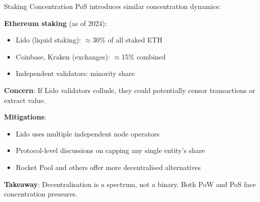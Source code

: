 \documentclass[10pt]{beamer}
\begin{document}
\begin{frame}{Staking Concentration}
  PoS introduces similar concentration dynamics:
  
  \vspace{1em}
  \textbf{Ethereum staking} (as of 2024):
  \begin{itemize}
    \item Lido (liquid staking): $\approx$30\% of all staked ETH
    \item Coinbase, Kraken (exchanges): $\approx$15\% combined
    \item Independent validators: minority share
  \end{itemize}
  
  \vspace{1em}
  \textbf{Concern}: If Lido validators collude, they could potentially censor transactions or extract value.
  
  \vspace{1em}
  \textbf{Mitigations}:
  \begin{itemize}
    \item Lido uses multiple independent node operators
    \item Protocol-level discussions on capping any single entity's share
    \item Rocket Pool and others offer more decentralised alternatives
  \end{itemize}
  
  \vspace{1em}
  \textbf{Takeaway}: Decentralisation is a spectrum, not a binary. Both PoW and PoS face concentration pressures.
\end{frame}
\end{document}
